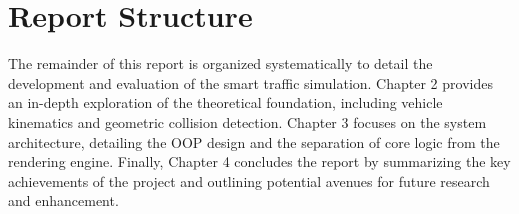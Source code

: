 \documentclass[../report_main.tex]{subfiles}
\begin{document}
\section{Report Structure}
The remainder of this report is organized systematically to detail the development and evaluation of the smart traffic simulation. Chapter 2 provides an in-depth exploration of the theoretical foundation, including vehicle kinematics and geometric collision detection. Chapter 3 focuses on the system architecture, detailing the \gls{OOP} design and the separation of core logic from the rendering engine. Finally, Chapter 4 concludes the report by summarizing the key achievements of the project and outlining potential avenues for future research and enhancement.
\end{document}
